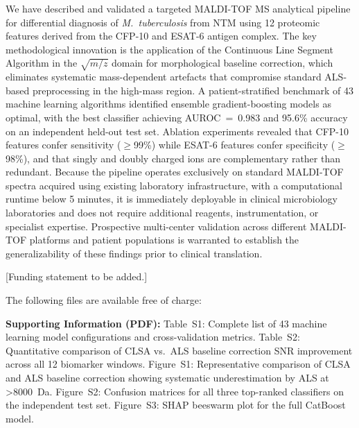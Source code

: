 \documentclass[journal=ancham, manuscript=article, layout=traditional]{achemso}
\begin{document}
We have described and validated a targeted MALDI-TOF MS analytical
pipeline for differential diagnosis of \textit{M.~tuberculosis} from
NTM using 12 proteomic features derived from the CFP-10 and ESAT-6
antigen complex.
The key methodological innovation is the application of the Continuous
Line Segment Algorithm in the $\sqrt{m/z}$ domain for morphological
baseline correction, which eliminates systematic mass-dependent
artefacts that compromise standard ALS-based preprocessing in the
high-mass region.
A patient-stratified benchmark of 43 machine learning algorithms
identified ensemble gradient-boosting models as optimal, with
the best classifier achieving AUROC~=~0.983 and 95.6\% accuracy
on an independent held-out test set.
Ablation experiments revealed that CFP-10 features confer sensitivity
($\geq$99\%) while ESAT-6 features confer specificity ($\geq$98\%),
and that singly and doubly charged ions are complementary rather
than redundant.
Because the pipeline operates exclusively on standard MALDI-TOF
spectra acquired using existing laboratory infrastructure,
with a computational runtime below 5 minutes, it is immediately
deployable in clinical microbiology laboratories and does not
require additional reagents, instrumentation, or specialist
expertise.
Prospective multi-center validation across different MALDI-TOF
platforms and patient populations is warranted to establish the
generalizability of these findings prior to clinical translation.

\begin{acknowledgement}
[Funding statement to be added.]
\end{acknowledgement}

\begin{suppinfo}
The following files are available free of charge:

\textbf{Supporting Information (PDF):}
Table~S1: Complete list of 43 machine learning model configurations
and cross-validation metrics.
Table~S2: Quantitative comparison of CLSA vs.\ ALS baseline
correction SNR improvement across all 12 biomarker windows.
Figure~S1: Representative comparison of CLSA and ALS baseline
correction showing systematic underestimation by ALS at
\textgreater\SI{8000}{\dalton}.
Figure~S2: Confusion matrices for all three top-ranked classifiers
on the independent test set.
Figure~S3: SHAP beeswarm plot for the full CatBoost model.
\end{suppinfo}
\end{document}
